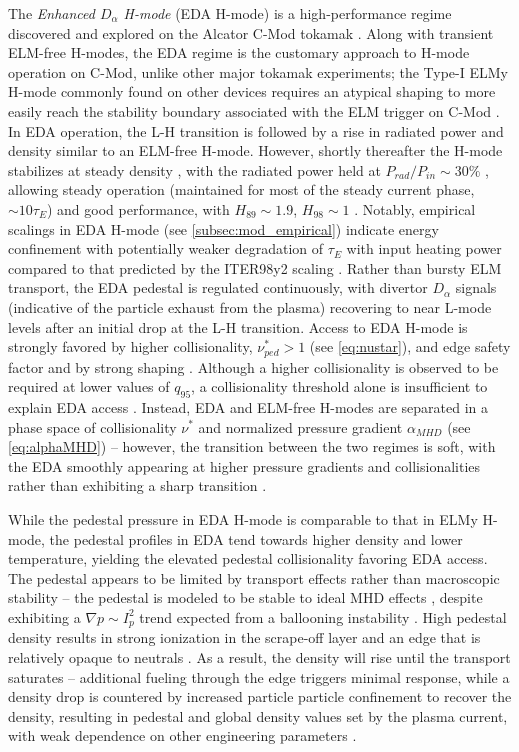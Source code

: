 The \emph{Enhanced $D_\alpha$ H-mode} (EDA H-mode) is a high-performance regime discovered and explored on the Alcator C-Mod tokamak \cite{Greenwald1999,Hubbard2001,Hughes2005}.  Along with transient ELM-free H-modes, the EDA regime is the customary approach to H-mode operation on C-Mod, unlike other major tokamak experiments; the Type-I ELMy H-mode commonly found on other devices requires an atypical shaping to more easily reach the stability boundary associated with the ELM trigger on C-Mod \cite{Hughes2013}.  In EDA operation, the L-H transition is followed by a rise in radiated power and density similar to an ELM-free H-mode.  However, shortly thereafter the H-mode stabilizes at steady density \cite{Greenwald1999}, with the radiated power held at $P_{rad}/P_{in} \sim 30\%$ \cite{Hubbard1998}, allowing steady operation (maintained for most of the steady current phase, $\sim 10\tau_E$) and good performance, with $H_{89} \sim 1.9$, $H_{98} \sim 1$ \cite{Hubbard2001}.  Notably, empirical scalings in EDA H-mode (see \cref{subsec:mod_empirical}) indicate energy confinement with potentially weaker degradation of $\tau_E$ with input heating power compared to that predicted by the ITER98y2 scaling \cite{Hughes2002,Hughes2005,Hughes2006}.  Rather than bursty ELM transport, the EDA pedestal is regulated continuously, with divertor $D_\alpha$ signals (indicative of the particle exhaust from the plasma) recovering to near L-mode levels after an initial drop at the L-H transition.  Access to EDA H-mode is strongly favored by higher collisionality, $\nu^*_{ped} > 1$ (see \cref{eq:nustar}), and edge safety factor \cite{Hughes2002,Mossessian2002} and by strong shaping \cite{Mossessian2002}.  Although a higher collisionality is observed to be required at lower values of $q_{95}$, a collisionality threshold alone is insufficient to explain EDA access \cite{Hughes2002}.  Instead, EDA and ELM-free H-modes are separated in a phase space of collisionality $\nu^*$ and normalized pressure gradient $\alpha_{MHD}$ (see \cref{eq:alphaMHD}) -- however, the transition between the two regimes is soft, with the EDA smoothly appearing at higher pressure gradients and collisionalities rather than exhibiting a sharp transition \cite{Hughes2007a}.

While the pedestal pressure in EDA H-mode is comparable to that in ELMy H-mode, the pedestal profiles in EDA tend towards higher density and lower temperature, yielding the elevated pedestal collisionality favoring EDA access.  The pedestal appears to be limited by transport effects rather than macroscopic stability -- the pedestal is modeled to be stable to ideal MHD effects \cite{Mossessian2002,Hughes2013}, despite exhibiting a $\nabla p \sim I_p^2$ trend expected from a ballooning instability \cite{Hughes2006}.  High pedestal density results in strong ionization in the scrape-off layer and an edge that is relatively opaque to neutrals \cite{Hubbard2007,Greenwald2007}.  As a result, the density will rise until the transport saturates -- additional fueling through the edge triggers minimal response, while a density drop is countered by increased particle particle confinement to recover the density, resulting in pedestal and global density values set by the plasma current, with weak dependence on other engineering parameters \cite{Hughes2007}.


